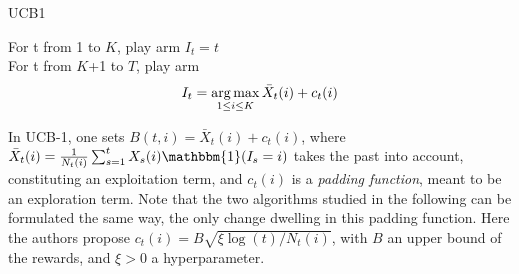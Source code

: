 \begin{algorithm}
    \caption{UCB1}
	\label{alg:ucb1}
    For t from 1 to $K$, play arm $I_t = t$ \\
    For t from $K$+1 to $T$, play arm 
    $$ I_t = \operatorname*{arg\,max}_{1\leq i \leq K} \bar X_t(i) + c_t(i)$$
\end{algorithm}


In UCB-1, one sets $B(t,i)=\bar{X}_t(i)+c_t(i)$, where $\bar{X}_t(i)=\frac{1}{N_t(i)}\sum_{s=1}^t X_s(i)\mathbbm{1}(I_s=i)$ takes the past into account, constituting an exploitation term, and $c_t(i)$ is a \textit{padding function}, meant to be an exploration term. Note that the two algorithms studied in the following can be formulated the same way, the only change dwelling in this padding function. Here the authors propose $c_t(i)=B\sqrt{\xi \log(t)/N_t(i)}$, with $B$ an upper bound of the rewards, and $\xi>0$ a hyperparameter.

